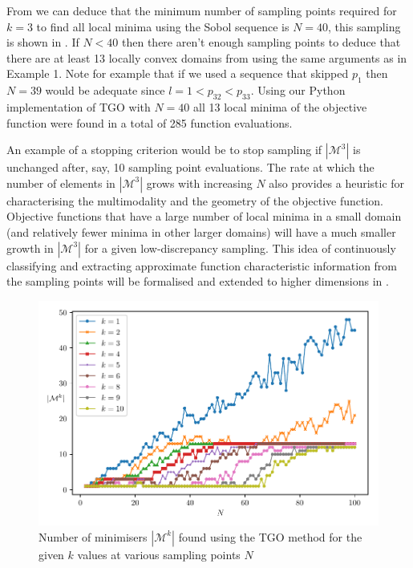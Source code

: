 From  we can deduce that the minimum number of sampling points required for $k = 3$ to find all local minima using the Sobol sequence is $N = 40$, this sampling is shown in .  If  $N < 40$ then there aren't enough sampling points to deduce that there are at least 13 locally convex domains from using the same arguments as in Example 1. Note for example that if we used a sequence that skipped $p_1$ then $N =39$ would be adequate since $l = 1 < p_{32} < p_{33}$. Using our Python implementation of TGO \citep{TGOpy} with $N = 40$ all 13 local minima of the objective function were found in a total of 285 function evaluations. 

An example of a stopping criterion would be to stop sampling if $|\mathcal{M}^3|$ is unchanged after, say, 10 sampling point evaluations. The rate at which the number of elements in $|\mathcal{M}^3|$ grows with increasing $N$ also provides a heuristic for characterising the multimodality and the geometry of the objective function. Objective functions that have a large number of local minima in a small domain (and relatively fewer minima in other larger domains) will have a much smaller growth in $|\mathcal{M}^3|$ for a given low-discrepancy sampling. This idea of continuously classifying and extracting approximate function characteristic information from the sampling points will be formalised and extended to higher dimensions in .


\begin{figure}  \label{fig:mink2}
\centerline{\includegraphics[scale=1.0]{./Fig4.pdf}}
{\caption{Number of minimisers $|\mathcal{M}^k|$ found using the TGO method for the given $k$ values at various sampling points $N$}  \label{fig:mink2}}
\end{figure}

